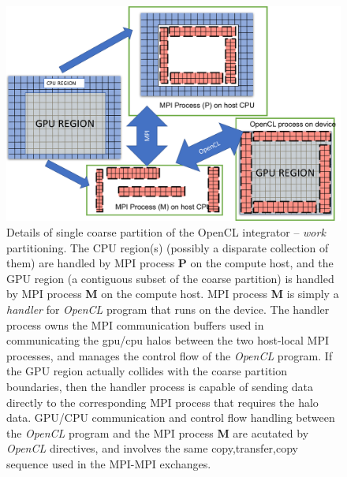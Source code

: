 \documentclass[11pt]{article}
\begin{document}
\begin{figure}[h]
\begin{center}
\includegraphics[width=\textwidth]{Figures/Lukas2}
\vspace{-20pt}
\caption{Details of single coarse partition of the OpenCL integrator -- \textit{work} partitioning. The CPU region(s) (possibly a disparate collection of them) are handled by MPI process \textbf{P} on the compute host, and the GPU region (a contiguous subset of the coarse partition) is handled by MPI process \textbf{M} on the compute host. MPI process \textbf{M} is simply a \textit{handler} for \textit{OpenCL} program that runs on the device. The handler process owns the MPI communication buffers used in communicating the gpu/cpu halos between the two host-local MPI processes, and manages the control flow of the \textit{OpenCL} program.  If the GPU region actually collides with the coarse partition boundaries, then the handler process is capable of sending data directly to the corresponding MPI process that requires the halo data. GPU/CPU communication and control flow handling between the \textit{OpenCL} program and the MPI process \textbf{M} are acutated by \textit{OpenCL} directives, and involves the same copy,transfer,copy sequence used in the MPI-MPI exchanges.}\label{Figure:Lukas2}
\end{center}
\end{figure}
\end{document}
